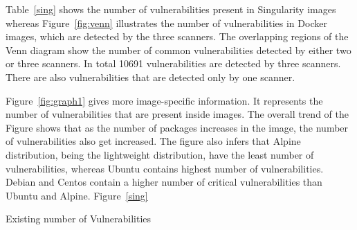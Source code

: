 \documentclass[a4paper,num-refs]{oup-contemporary}
\begin{document}
Table~\ref{sing} shows the number of vulnerabilities present in Singularity images whereas 
Figure~\ref{fig:venn} illustrates the number of vulnerabilities in Docker images, which are detected by the three scanners. The
overlapping regions of the Venn diagram show the number of common vulnerabilities detected by either two or
three scanners. In total 10691 vulnerabilities are detected by three scanners.
There are also vulnerabilities that are detected only by one scanner.

Figure~\ref{fig:graph1} gives more image-specific information.
It represents the number of vulnerabilities that are present inside images.
The overall trend of the Figure shows that as the number of packages increases in the image, the number of vulnerabilities
also get increased.
The figure also infers that Alpine distribution, being the
lightweight distribution, have the least number of vulnerabilities, whereas Ubuntu contains highest number of
vulnerabilities. Debian and Centos contain a higher number of critical vulnerabilities than Ubuntu and Alpine.
Figure~\ref{sing}
\begin{table}
%
       \centering
	\caption{\label{table1}Existing number of Vulnerabilities}
\end{table}
\end{document}
